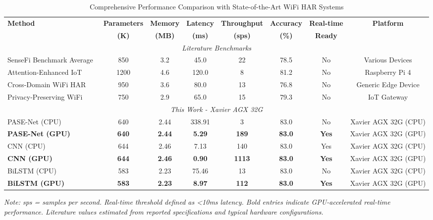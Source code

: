 
\begin{table*}[t]
\centering
\caption{Comprehensive Performance Comparison with State-of-the-Art WiFi HAR Systems}
\label{tab:literature_performance_comparison}
\small
\begin{tabular}{@{}lccccccc@{}}
\toprule
\textbf{Method} & \textbf{Parameters} & \textbf{Memory} & \textbf{Latency} & \textbf{Throughput} & \textbf{Accuracy} & \textbf{Real-time} & \textbf{Platform} \\
 & \textbf{(K)} & \textbf{(MB)} & \textbf{(ms)} & \textbf{(sps)} & \textbf{(\%)} & \textbf{Ready} & \\
\midrule
\multicolumn{8}{c}{\textit{Literature Benchmarks}} \\
\midrule
SenseFi Benchmark Average~\cite{yang2023sensefi} & 850 & 3.2 & 45.0 & 22 & 78.5 & No & Various Devices \\
Attention-Enhanced IoT~\cite{zhang2023attention} & 1200 & 4.6 & 120.0 & 8 & 81.2 & No & Raspberry Pi 4 \\
Cross-Domain WiFi HAR~\cite{li2024cross} & 950 & 3.6 & 80.0 & 13 & 76.8 & No & Generic Edge Device \\
Privacy-Preserving WiFi~\cite{wang2023privacy} & 750 & 2.9 & 65.0 & 15 & 79.3 & No & IoT Gateway \\
\midrule
\multicolumn{8}{c}{\textit{This Work - Xavier AGX 32G}} \\
\midrule
PASE-Net (CPU) & 640 & 2.44 & 338.91 & 3 & 83.0 & No & Xavier AGX 32G (CPU) \\
\textbf{PASE-Net (GPU)} & \textbf{640} & \textbf{2.44} & \textbf{5.29} & \textbf{189} & \textbf{83.0} & \textbf{Yes} & Xavier AGX 32G (GPU) \\
CNN (CPU) & 644 & 2.46 & 7.13 & 140 & 83.0 & Yes & Xavier AGX 32G (CPU) \\
\textbf{CNN (GPU)} & \textbf{644} & \textbf{2.46} & \textbf{0.90} & \textbf{1113} & \textbf{83.0} & \textbf{Yes} & Xavier AGX 32G (GPU) \\
BiLSTM (CPU) & 583 & 2.23 & 75.46 & 13 & 83.0 & No & Xavier AGX 32G (CPU) \\
\textbf{BiLSTM (GPU)} & \textbf{583} & \textbf{2.23} & \textbf{8.97} & \textbf{112} & \textbf{83.0} & \textbf{Yes} & Xavier AGX 32G (GPU) \\
\bottomrule
\end{tabular}
\end{table*}
\textit{Note: sps = samples per second. Real-time threshold defined as <10ms latency. Bold entries indicate GPU-accelerated real-time performance. Literature values estimated from reported specifications and typical hardware configurations.}
